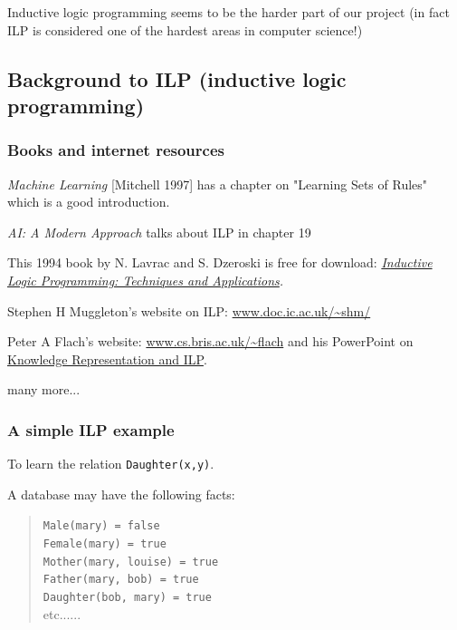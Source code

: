 Inductive logic programming seems to be the harder part of our project (in fact ILP is considered one of the hardest areas in computer science!)

\subsection{Background to ILP (inductive logic programming)}

\subsubsection{Books and internet resources}
\begin{compactenum-}
	\item \emph{Machine Learning} [Mitchell 1997] \emph{}has a chapter on "Learning Sets of Rules" which is a good introduction.
	\item \emph{AI: A Modern Approach} talks about ILP in chapter 19
	\item {\normalsize This 1994 book by N. Lavrac and S. Dzeroski is free for download: \textit{\href{http://www-ai.ijs.si/SasoDzeroski/ILPBook/}{Inductive Logic Programming: Techniques and Applications}.}}
	\item Stephen H Muggleton's website on ILP: \href{http://www.doc.ic.ac.uk/~shm/}{www.doc.ic.ac.uk/\textasciitilde shm/}
	\item Peter A Flach's website: \href{http://www.cs.bris.ac.uk/~flach/}{www.cs.bris.ac.uk/\textasciitilde flach} and his PowerPoint on \href{http://macflach.cs.bris.ac.uk/~flach/presentations/CL2000HTML/CL2000.ppt}{Knowledge Representation and ILP}.
	\item many more...
\end{compactenum-}

\subsubsection{A simple ILP example}

To learn the relation \texttt{Daughter(x,y)}.

A database may have the following facts:
\begin{quote}

\texttt{Male(mary) = false
\\
    Female(mary) = true
\\
    Mother(mary, louise) = true
\\
    Father(mary, bob) = true
\\
    Daughter(bob, mary) = true
\\}etc......
\end{quote}

